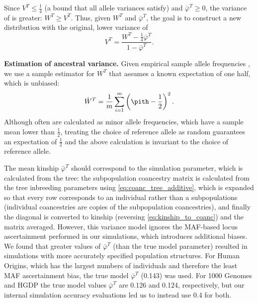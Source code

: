 \documentclass[11pt]{article}
\begin{document}
Since $V^T \le \frac{1}{4}$ (a bound that all allele variances satisfy) and $\bar{\varphi}^T \ge 0$, the variance of \pith is greater: $W^T \ge V^T$.
Thus, given $W^T$ and $\bar{\varphi}^T$, the goal is to construct a new distribution with the original, lower variance of
\begin{equation}
  \label{eq:var_undiff}
  V^T
  =
  \frac{ W^T - \frac{1}{4} \bar{\varphi}^T }{ 1 - \bar{\varphi}^T }
  .
\end{equation}

\textbf{Estimation of ancestral variance.}
Given empirical sample allele frequencies \pith, we use a sample estimator for $W^T$ that assumes a known expectation of one half, which is unbiased:
$$
\hat{W}^T
=
\frac{1}{m} \sum_{i=1}^m \left( \pith - \frac{1}{2} \right)^2
.
$$
Although often \pith are calculated as minor allele frequencies, which have a sample mean lower than $\frac{1}{2}$, treating the choice of reference allele as random guarantees an expectation of $\frac{1}{2}$ and the above calculation is invariant to the choice of reference allele.

The mean kinship $\bar{\varphi}^T$ should correspond to the simulation parameter, which is calculated from the tree: the subpopulation coancestry matrix is calculated from the tree inbreeding parameters using \cref{eq:coanc_tree_additive}, which is expanded so that every row corresponds to an individual rather than a subpopulations (individual coancestries are copies of the subpopulation coancestries), and finally the diagonal is converted to kinship (reversing \cref{eq:kinship_to_coanc}) and the matrix averaged.
However, this variance model ignores the MAF-based locus ascertainment performed in our simulations, which introduces additional biases.
We found that greater values of $\bar{\varphi}^T$ (than the true model parameter) resulted in simulations with more accurately specified population structures.
For Human Origins, which has the largest numbers of individuals and therefore the least MAF ascertainment bias, the true model $\bar{\varphi}^T$ (0.143) was used.
For 1000 Genomes and HGDP the true model values $\bar{\varphi}^T$ are 0.126 and 0.124, respectively, but our internal simulation accuracy evaluations led us to instead use 0.4 for both.
\end{document}
